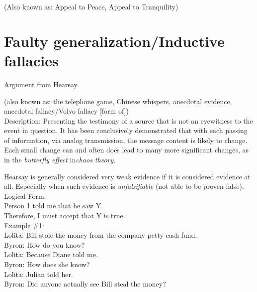 \documentclass[a4paper,12pt,single,pdftex]{scrartcl}
\begin{document}
  
    
      (Also known as: Appeal to Peace, Appeal to Tranquility)
    \\

  \section{Faulty generalization/Inductive fallacies}


Argument from Hearsay
    
      (also known as: the telephone game, Chinese whispers, anecdotal evidence, anecdotal fallacy/Volvo fallacy [form of])
    \\

  
    Description: Presenting the testimony of a source that is not an eyewitness to the event in question.  It has been conclusively demonstrated that with each passing of information, via analog transmission, the message content is likely to change.  Each small change can and often does lead to many more significant changes, as in the {\it butterfly effect} in{\it  chaos theory}.

    
      Hearsay is generally considered very weak evidence if it is considered evidence at all.  Especially when such evidence is {\it unfalsifiable}  (not able to be proven false).
    \\

    
      Logical Form:
    \\

    
      Person 1 told me that he saw Y.
    \\

    
      Therefore, I must accept that Y is true.
    \\

    
      Example \#1:
    \\

    
      Lolita: Bill stole the money from the company petty cash fund.
    \\

    
      Byron: How do you know?
    \\

    
      Lolita: Because Diane told me.
    \\

    
      Byron: How does she know?
    \\

    
      Lolita: Julian told her.
    \\

    
      Byron: Did anyone actually see Bill steal the money?
    \\
\end{document}
